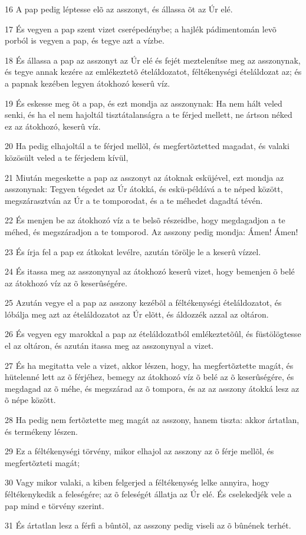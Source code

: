 \par 16 A pap pedig léptesse elõ az asszonyt, és állassa õt az Úr elé.
\par 17 És vegyen a pap szent vizet cserépedénybe; a hajlék pádimentomán levõ porból is vegyen a pap, és tegye azt a vízbe.
\par 18 És állassa a pap az asszonyt az Úr elé és fejét meztelenítse meg az asszonynak, és tegye annak kezére az emlékeztetõ ételáldozatot, féltékenységi ételáldozat az; és a papnak kezében legyen átokhozó keserû víz.
\par 19 És eskesse meg õt a pap, és ezt mondja az asszonynak: Ha nem hált veled senki, és ha el nem hajoltál tisztátalanságra a te férjed mellett, ne ártson néked ez az átokhozó, keserû víz.
\par 20 Ha pedig elhajoltál a te férjed mellõl, és megfertõztetted magadat, és valaki közösült veled a te férjedem kívül,
\par 21 Miután megeskette a pap az asszonyt az átoknak esküjével, ezt mondja az asszonynak: Tegyen tégedet az Úr átokká, és eskü-példává a te néped között, megszárasztván az Úr a te tomporodat, és a te méhedet dagadtá tévén.
\par 22 És menjen be az átokhozó víz a te belsõ részeidbe, hogy megdagadjon a te méhed, és megszáradjon a te tomporod. Az asszony pedig mondja: Ámen! Ámen!
\par 23 És írja fel a pap ez átkokat levélre, azután törölje le a keserû vízzel.
\par 24 És itassa meg az asszonynyal az átokhozó keserû vizet, hogy bemenjen õ belé az átokhozó víz az õ keserûségére.
\par 25 Azután vegye el a pap az asszony kezébõl a féltékenységi ételáldozatot, és lóbálja meg azt az ételáldozatot az Úr elõtt, és áldozzék azzal az oltáron.
\par 26 És vegyen egy marokkal a pap az ételáldozatból emlékeztetõûl, és füstölögtesse el az oltáron, és azután itassa meg az asszonynyal a vizet.
\par 27 És ha megitatta vele a vizet, akkor lészen, hogy, ha megfertõztette magát, és hütelenné lett az õ férjéhez, bemegy az átokhozó víz õ belé az õ keserûségére, és megdagad az õ méhe, és megszárad az õ tompora, és az az asszony átokká lesz az õ népe között.
\par 28 Ha pedig nem fertõztette meg magát az asszony, hanem tiszta: akkor ártatlan, és termékeny lészen.
\par 29 Ez a féltékenységi törvény, mikor elhajol az asszony az õ férje mellõl, és megfertõzteti magát;
\par 30 Vagy mikor valaki, a kiben felgerjed a féltékenység lelke annyira, hogy féltékenykedik a feleségére; az õ feleségét állatja az Úr elé. És cselekedjék vele a pap mind e törvény szerint.
\par 31 És ártatlan lesz a férfi a bûntõl, az asszony pedig viseli az õ bûnének terhét.

